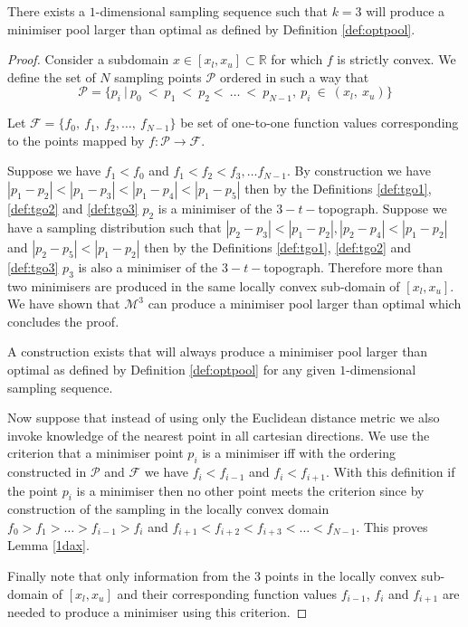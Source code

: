\begin{theorem} \label{1d}
There exists a $1$-dimensional sampling sequence such that $k = 3$ will produce a minimiser pool larger than optimal as defined by Definition \ref{def:optpool}.
\end{theorem}

\begin{proof}
Consider a subdomain $x \in [x_l, x_u] \subset \mathbb{R}$ for which $f$ is strictly convex. We define the set of $N$ sampling points $\mathcal{P}$ ordered in such a way that $$\mathcal{P} = \{p_i~|~p_{0}~<~p_{1}~<~p_{2}<~\dots~<~p_{N-1},~p_{i}~\in~(x_l,~x_u)\}$$

Let $\mathcal{F} = \{f_{0},~f_{1},~f_{2},\dots,~f_{N-1}\}$ be set of one-to-one function values corresponding to the points mapped by $f:\mathcal{P} \rightarrow \mathcal{F}$. 

Suppose we have $f_1 < f_0$ and $f_1 < f_2 < f_3, \dots f_{N-1}$.  %
By construction we have  $|p_1 - p_2| < |p_1 - p_3| < |p_1 - p_4| < |p_1 - p_5|$ then by the Definitions \ref{def:tgo1}, \ref{def:tgo2} and \ref{def:tgo3} $p_2$ is a minimiser of the $3-t-$topograph. Suppose we have a sampling distribution such that $|p_2 - p_3| < |p_1 - p_2|, |p_2 - p_4| < |p_1 - p_2|$ and $|p_2 - p_5| < |p_1 - p_2|$ then by the Definitions \ref{def:tgo1}, \ref{def:tgo2} and \ref{def:tgo3} $p_3$ is also a minimiser of the $3-t-$topograph. Therefore more than two minimisers are produced in the same locally convex sub-domain of $[x_l, x_u]$. We have shown that $\mathcal{M}^3$ can produce a minimiser pool larger than optimal which concludes the proof.

\begin{lemma} \label{1dax}
A construction exists that will always produce a minimiser pool larger than optimal as defined by Definition \ref{def:optpool} for any given $1$-dimensional sampling sequence.
\end{lemma}

Now suppose that instead of using only the Euclidean distance metric we also invoke knowledge of the nearest point in all cartesian directions. We use the criterion that a minimiser point $p_i$ is a minimiser iff \normalfont with the ordering constructed in $\mathcal{P}$ and $\mathcal{F}$ we have $f_i < f_{i - 1}$ and $f_i < f_{i + 1}$. With this definition if the point $p_i$ is a minimiser then no other point meets the criterion since by construction of the sampling in the locally convex domain $f_{0} > f_{1} > \dots > f_{i - 1} > f_i$ and $f_{i + 1} < f_{i + 2} < f_{i + 3} < \dots < f_{N-1}$. This proves Lemma \ref{1dax}. 

Finally note that only information from the 3 points in the locally convex sub-domain of $[x_l, x_u]$ and their corresponding function values $f_{i - 1}$, $f_{i}$ and $f_{i + 1}$ are needed to produce a minimiser using this criterion.
\end{proof}

